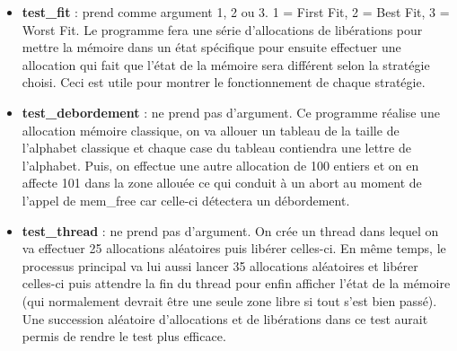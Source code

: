 \documentclass[10pt,a4paper]{article}
\begin{document}
\begin{itemize}
	\item \textbf{test\_fit} : prend comme argument 1, 2 ou 3. 1 = First Fit, 2 = Best Fit, 3 = Worst Fit. Le programme fera une série d'allocations de libérations pour mettre la mémoire dans un état spécifique pour ensuite effectuer une allocation qui fait que l'état de la mémoire sera différent selon la stratégie choisi. Ceci est utile pour montrer le fonctionnement de chaque stratégie.
	\item \textbf{test\_debordement} : ne prend pas d'argument. Ce programme réalise une allocation mémoire classique, on va allouer un tableau de la taille de l'alphabet classique et chaque case du tableau contiendra une lettre de l'alphabet. Puis, on effectue une autre allocation de 100 entiers et on en affecte 101 dans la zone allouée ce qui conduit à un abort au moment de l'appel de mem\_free car celle-ci détectera un débordement.
	\item \textbf{test\_thread} : ne prend pas d'argument. On crée un thread dans lequel on va effectuer 25 allocations aléatoires puis libérer celles-ci. En même temps, le processus principal va lui aussi lancer 35 allocations aléatoires et libérer celles-ci puis attendre la fin du thread pour enfin afficher l'état de la mémoire (qui normalement devrait être une seule zone libre si tout s'est bien passé). Une succession aléatoire d'allocations et de libérations dans ce test aurait permis de rendre le test plus efficace.
\end{itemize}
\end{document}
